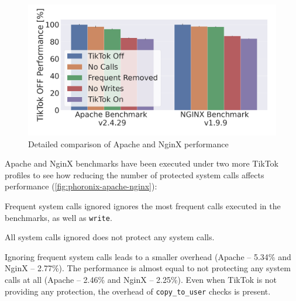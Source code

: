 \documentclass[conference]{IEEEtran}
\newcommand{\sysname}{TikTok}
\begin{document}
\begin{figure}[]
  \centering
  \includegraphics[width=\linewidth]{graphs/apache-nginx-5.png}
  \caption{Detailed comparison of Apache and NginX performance}
  \label{fig:phoronix-apache-nginx}
\end{figure}

Apache and NginX benchmarks have been executed under two more \sysname{}
profiles to see how reducing the number of protected system calls affects
performance (\autoref{fig:phoronix-apache-nginx}):

\begin{LaTeXdescription}
  \item[Frequent system calls ignored] ignores the most frequent calls executed in the benchmarks, as well as \texttt{write}.
  \item[All system calls ignored] does not protect any system calls.
\end{LaTeXdescription}

Ignoring frequent system calls leads to a smaller overhead (Apache -- 5.34\% and
NginX -- 2.77\%). The performance is almost equal to not protecting any system
calls at all (Apache -- 2.46\% and NginX -- 2.25\%). Even when \sysname{}
is not providing any protection, the overhead of \texttt{copy\_to\_user} checks
is present.
\end{document}
